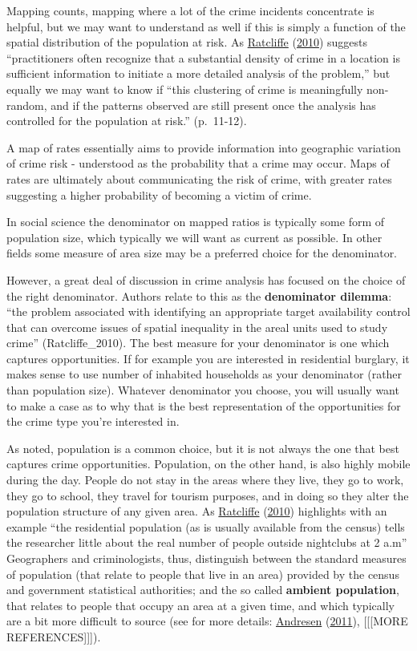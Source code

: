 \documentclass[
]{book}
\begin{document}
Mapping counts, mapping where a lot of the crime incidents concentrate is helpful, but we may want to understand as well if this is simply a function of the spatial distribution of the population at risk. As \protect\hyperlink{ref-Ratcliffe_2010}{Ratcliffe} (\protect\hyperlink{ref-Ratcliffe_2010}{2010}) suggests ``practitioners often recognize that a substantial density of crime in a location is sufficient information to initiate a more detailed analysis of the problem,'' but equally we may want to know if ``this clustering of crime is meaningfully non-random, and if the patterns observed are still present once the analysis has controlled for the population at risk.'' (p.~11-12).

A map of rates essentially aims to provide information into geographic variation of crime risk - understood as the probability that a crime may occur. Maps of rates are ultimately about communicating the risk of crime, with greater rates suggesting a higher probability of becoming a victim of crime.

In social science the denominator on mapped ratios is typically some form of population size, which typically we will want as current as possible. In other fields some measure of area size may be a preferred choice for the denominator.

However, a great deal of discussion in crime analysis has focused on the choice of the right denominator. Authors relate to this as the \textbf{denominator dilemma}: ``the problem associated with identifying an appropriate target availability control that can overcome issues of spatial inequality in the areal units used to study crime'' (Ratcliffe\_2010). The best measure for your denominator is one which captures opportunities. If for example you are interested in residential burglary, it makes sense to use number of inhabited households as your denominator (rather than population size). Whatever denominator you choose, you will usually want to make a case as to why that is the best representation of the opportunities for the crime type you're interested in.

As noted, population is a common choice, but it is not always the one that best captures crime opportunities. Population, on the other hand, is also highly mobile during the day. People do not stay in the areas where they live, they go to work, they go to school, they travel for tourism purposes, and in doing so they alter the population structure of any given area. As \protect\hyperlink{ref-Ratcliffe_2010}{Ratcliffe} (\protect\hyperlink{ref-Ratcliffe_2010}{2010}) highlights with an example ``the residential population (as is usually available from the census) tells the researcher little about the real number of people outside nightclubs at 2 a.m'' Geographers and criminologists, thus, distinguish between the standard measures of population (that relate to people that live in an area) provided by the census and government statistical authorities; and the so called \textbf{ambient population}, that relates to people that occupy an area at a given time, and which typically are a bit more difficult to source (see for more details: \protect\hyperlink{ref-Andresen_2011}{Andresen} (\protect\hyperlink{ref-Andresen_2011}{2011}), {[}{[}{[}MORE REFERENCES{]}{]}{]}).
\end{document}

